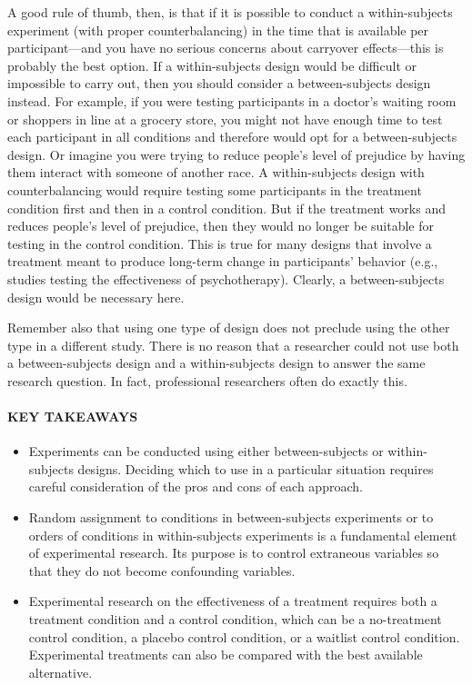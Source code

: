 \documentclass[
]{krantz}
\providecommand{\tightlist}{%
  \setlength{\itemsep}{0pt}\setlength{\parskip}{0pt}}
\begin{document}
A good rule of thumb, then, is that if it is possible to conduct a within-subjects experiment (with proper counterbalancing) in the time that is available per participant---and you have no serious concerns about carryover effects---this is probably the best option. If a within-subjects design would be difficult or impossible to carry out, then you should consider a between-subjects design instead. For example, if you were testing participants in a doctor's waiting room or shoppers in line at a grocery store, you might not have enough time to test each participant in all conditions and therefore would opt for a between-subjects design. Or imagine you were trying to reduce people's level of prejudice by having them interact with someone of another race. A within-subjects design with counterbalancing would require testing some participants in the treatment condition first and then in a control condition. But if the treatment works and reduces people's level of prejudice, then they would no longer be suitable for testing in the control condition. This is true for many designs that involve a treatment meant to produce long-term change in participants' behavior (e.g., studies testing the effectiveness of psychotherapy). Clearly, a between-subjects design would be necessary here.

Remember also that using one type of design does not preclude using the other type in a different study. There is no reason that a researcher could not use both a between-subjects design and a within-subjects design to answer the same research question. In fact, professional researchers often do exactly this.

\hypertarget{key-takeaways-12}{%
\paragraph*{KEY TAKEAWAYS}\label{key-takeaways-12}}

\begin{itemize}
\tightlist
\item
  Experiments can be conducted using either between-subjects or within-subjects designs. Deciding which to use in a particular situation requires careful consideration of the pros and cons of each approach.
\item
  Random assignment to conditions in between-subjects experiments or to orders of conditions in within-subjects experiments is a fundamental element of experimental research. Its purpose is to control extraneous variables so that they do not become confounding variables.
\item
  Experimental research on the effectiveness of a treatment requires both a treatment condition and a control condition, which can be a no-treatment control condition, a placebo control condition, or a waitlist control condition. Experimental treatments can also be compared with the best available alternative.
\end{itemize}
\end{document}
